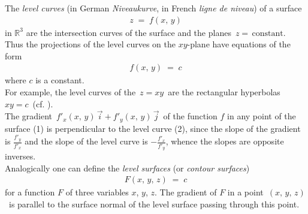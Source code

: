 \documentclass[12pt]{article}
\theoremstyle{definition}
\begin{document}
The {\em level curves} (in German {\em Niveaukurve}, in French {\em ligne de niveau}) of a surface 
\begin{align}
z \;=\; f(x,\,y)
\end{align}
in $\mathbb{R}^3$ are the intersection curves of the surface and the planes \,$z = \,\mathrm{constant}$.  Thus the projections of the level curves on the $xy$-plane have equations of the form
\begin{align}
f(x,\,y) \;=\; c
\end{align}
where $c$ is a constant.\\

For example, the level curves of the  \,$z = xy$\, are the rectangular hyperbolas \;$xy = c$\, (cf. ).\\

The gradient \,$f'_x(x,\,y)\,\vec{i}\!+\!f'_y(x,\,y)\,\vec{j}$\, of the function $f$ in any point of the surface (1) is perpendicular to the level curve (2), since the slope of the gradient is $\displaystyle\frac{f'_y}{f'_x}$ and the slope of the level curve is $\displaystyle-\frac{f'_x}{f'_y}$, whence the slopes are opposite inverses.\\

Analogically one can define the {\em level surfaces} (or {\em contour surfaces})
\begin{align}
F(x,\,y,\,z) \;=\; c
\end{align}
for a function $F$ of three variables $x$, $y$, $z$.  The gradient of $F$ in a point\, $(x,\,y,\,z)$\, is parallel to the surface normal of the level surface passing through this point.




\end{document}
